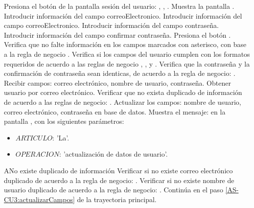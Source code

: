 \begin{UCtrayectoria}
	\UCpaso [\UCactor] Presiona el botón  de la 
	pantalla sesión del usuario: , , 
	.
	\UCpaso Muestra la pantalla .
	\UCpaso [\UCactor] \label{AS-CU3:introducirNombreDeUsuario} 
	Introducir información del campo correoElectronico.
	\UCpaso [\UCactor] \label{AS-CU3:introducirCorreoElectronico} 
	Introducir información del campo correoElectronico.
	\UCpaso [\UCactor] \label{AS-CU3:introducirContrasenia} Introducir 
	información del campo contraseña.
	\UCpaso [\UCactor] \label{AS-CU3:introducirConfirmarContrasenia} 
	Introducir información del campo confirmar contraseña.
	\UCpaso [\UCactor] Presiona el botón .
	\UCpaso Verifica que no falte información en los campos marcados con 
	asterisco, con base a la regla de negocio . 
	\UCpaso Verifica si los campos del usuario cumplen con los formatos 
	requeridos de acuerdo a las reglas de negocio , 
	,  y 
	.  
	  
	\UCpaso Verifica que la contraseña y la confirmación de contraseña sean 
	identicas, de acuerdo a la regla de negocio: . 
	\UCpaso Recibir campos: correo electrónico, nombre de usuario, 
	contraseña.
	\UCpaso Obtener usuario por correo electrónico.
	\UCpaso Verificar que no exista duplicado de información de acuerdo a 
	las reglas de negocio: . 
	\UCpaso \label{AS-CU3:actualizarCampos} Actualizar los campos: 
	nombre de usuario, correo electrónico, contraseña en base de datos.
	\UCpaso Muestra el mensaje:  en la pantalla 
	, con los siguientes parámetros:
	
	\begin{itemize}
		\item $ARTICULO$: 'La'.
		\item $OPERACION$: 'actualización de datos de usuario'.
	\end{itemize}
\end{UCtrayectoria}



\begin{UCtrayectoriaA}{A}{No existe duplicado de información}
	\UCpaso Verificar si no existe correo electrónico duplicado de acuerdo a 
	la regla de negocio: . 
	\UCpaso \label{AS-CU3A:noDuplicados} Verificar si no existe nombre de 
	usuario duplicado de acuerdo a la regla de negocio: 
	. 
	\UCpaso Continúa en el paso \ref{AS-CU3:actualizarCampos} de la 
	trayectoria principal.
\end{UCtrayectoriaA}

